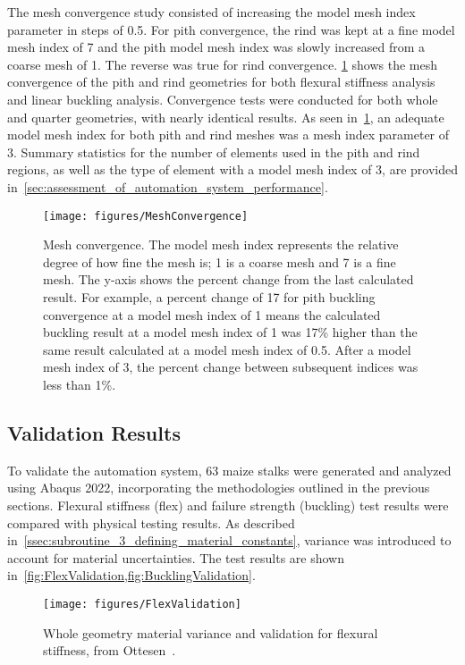 The mesh convergence study consisted of increasing the model mesh index parameter in steps of 0.5. For pith convergence, the rind was kept at a fine model mesh index of 7 and the pith model mesh index was slowly increased from a coarse mesh of 1. The reverse was true for rind convergence. \cref{fig:MeshConvergence} shows the mesh convergence of the pith and rind geometries for both flexural stiffness analysis and linear buckling analysis. Convergence tests were conducted for both whole and quarter geometries, with nearly identical results. As seen in~\cref{fig:MeshConvergence}, an adequate model mesh index for both pith and rind meshes was a mesh index parameter of 3. Summary statistics for the number of elements used in the pith and rind regions, as well as the type of element with a model mesh index of 3, are provided in~\cref{sec:assessment_of_automation_system_performance}.

\begin{figure}[htbp]
	\centering
	\texttt{[image: figures/MeshConvergence]}
	\caption[Mesh convergence.]{Mesh convergence. The model mesh index represents the relative degree of how fine the mesh is; 1 is a coarse mesh and 7 is a fine mesh. The y-axis shows the percent change from the last calculated result. For example, a percent change of 17 for pith buckling convergence at a model mesh index of 1 means the calculated buckling result at a model mesh index of 1 was 17\% higher than the same result calculated at a model mesh index of 0.5. After a model mesh index of 3, the percent change between subsequent indices was less than 1\%.}
	\label{fig:MeshConvergence}
\end{figure}

\subsection{Validation Results}
\label{ssec:validation_results}
To validate the automation system, 63 maize stalks were generated and analyzed using Abaqus 2022, incorporating the methodologies outlined in the previous sections. Flexural stiffness (flex) and failure strength (buckling) test results were compared with physical testing results. As described in~\cref{ssec:subroutine_3_defining_material_constants}, variance was introduced to account for material uncertainties. The test results are shown in~\cref{fig:FlexValidation,fig:BucklingValidation}.

\begin{figure}[htbp]
	\centering
	\texttt{[image: figures/FlexValidation]}
	\caption[Whole geometry material variance and validation for flexural stiffness.]{Whole geometry material variance and validation for flexural stiffness, from Ottesen~\protect\cite{ottesen_development_2023-1}.}
	\label{fig:FlexValidation}
\end{figure}

